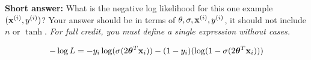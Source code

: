 \begin{parts}
\begin{subparts}
    \subpart[2] \textbf{Short answer:} What is the negative log likelihood for this one example $(\mathbf{x}^{(i)},y^{(i)})$? Your answer should be in terms of $\theta,\sigma,\mathbf{x}^{(i)},y^{(i)}$, it should not include $n$ or $\tanh$. 
    \textit{For full credit, you must define a single expression without cases. }
    \begin{tcolorbox}[fit,height=2cm, width=15cm, blank, borderline={1pt}{-2pt}]
    \end{tcolorbox} 
    \begin{soln}
        \begin{equation}
            -\log L = -y_i \log(\sigma(2\boldsymbol \theta^T\mathbf{x}_i)) - (1-y_i)(\log(1-\sigma(2\boldsymbol \theta^T\mathbf{x}_i)))
        \end{equation}
    \end{soln}



\end{subparts}
\end{parts}
